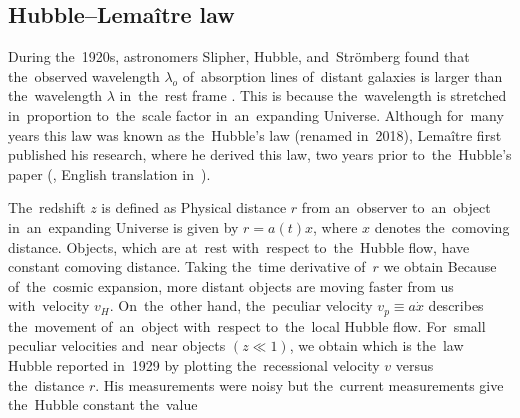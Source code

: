 \subsection{Hubble--Lema\^{i}tre law}
During the~1920s, astronomers Slipher, Hubble, and~Str{\"o}mberg found that the~observed wavelength $\lambda_o$ of~absorption lines of~distant galaxies is larger than the~wavelength $\lambda$ in~the~rest frame \parencite{1925ApJ....61..353S,1929PNAS...15..168H}. This is because the~wavelength is stretched in~proportion to~the~scale factor in~an~expanding Universe. Although for~many years this law was known as the~Hubble's law (renamed in~2018), Lema\^{i}tre first published his research, where he derived this law, two years prior to~the~Hubble's paper (\textcite{1927ASSB...47...49L}, English translation in~\textcite{1931MNRAS..91..483L}).

The~redshift $z$ is defined as
Physical distance $r$ from an~observer to~an~object in~an~expanding Universe is given by $r=a(t)x$, where $x$ denotes the~comoving distance. Objects, which are at~rest with~respect to~the~Hubble flow, have constant comoving distance. Taking the~time derivative of~$r$ we obtain
Because of~the~cosmic expansion, more distant objects are moving faster from us with~velocity $v_H$. On~the~other hand, the~peculiar velocity $v_p\equiv a\dot x$ describes the~movement of~an~object with~respect to~the~local Hubble flow. For~small peculiar velocities and~near objects $(z\ll1)$, we obtain
which is the~law Hubble reported in~1929 by plotting the~recessional velocity $v$ versus the~distance $r$. His measurements were noisy but the~current measurements give the~Hubble constant the~value \parencite{planck_cosm}
